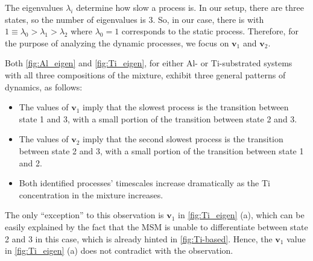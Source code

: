 The eigenvalues $\lambda_i$ determine how slow a process is. In our setup, there are three states, so the number of eigenvalues is $3$. So, in our case, there is with $1 \equiv \lambda_0 > \lambda_1 > \lambda_2$ where $\lambda_0 = 1$ corresponds to the static process. Therefore, for the purpose of analyzing the dynamic processes, we focus on $\mathbf{v}_1$ and $\mathbf{v}_2$. 

Both \cref{fig:Al_eigen} and \cref{fig:Ti_eigen}, for either Al- or Ti-substrated systems with all three compositions of the mixture, exhibit three general patterns of dynamics, as follows:
\begin{itemize}
    \item The values of $\mathbf{v}_1$ imply that the slowest process is the transition between state 1 and 3, with a small portion of the transition between state 2 and 3.
    \item The values of $\mathbf{v}_2$ imply that the second slowest process is the transition between state 2 and 3, with a small portion of the transition between state 1 and 2.
    \item Both identified processes' timescales increase dramatically as the Ti concentration in the mixture increases.
\end{itemize}
The only ``exception'' to this observation is $\mathbf{v}_1$ in \cref{fig:Ti_eigen} (a), which can be easily explained by the fact that the MSM is unable to differentiate between state 2 and 3 in this case, which is already hinted in \cref{fig:Ti-based}. Hence, the $\mathbf{v}_1$ value in \cref{fig:Ti_eigen} (a) does not contradict with the observation.


